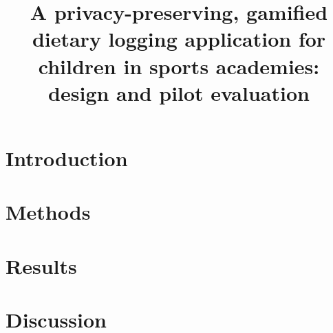 \documentclass[11pt,a4paper]{article}
\title{A privacy-preserving, gamified dietary logging application for children
in sports academies: design and pilot evaluation}
\author{}
\date{}
\begin{document}
\maketitle

\begin{abstract}
\end{abstract}

\section{Introduction}
\section{Methods}
\section{Results}
\section{Discussion}



\end{document}
